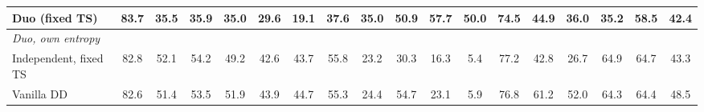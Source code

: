 \begin{table}[t]
{\begin{tabular}{l|c|ccc|cccc|cccc|cccc|c}
        \quad Duo (fixed TS) & 83.7 & 35.5 & 35.9 & 35.0 & 29.6 & 19.1 & 37.6 & 35.0 & 50.9 & 57.7 & 50.0 & 74.5 & 44.9 & 36.0 & 35.2 & 58.5 & 42.4 \\
        \midrule
        \multicolumn{18}{l}{\textit{Duo, own entropy}} \\
        \quad Independent, fixed TS & 82.8 & 52.1 & 54.2 & 49.2 & 42.6 & 43.7 & 55.8 & 23.2 & 30.3 & 16.3 & 5.4 & 77.2 & 42.8 & 26.7 & 64.9 & 64.7 & 43.3 \\
        \quad Vanilla DD & 82.6 & 51.4 & 53.5 & 51.9 & 43.9 & 44.7 & 55.3 & 24.4 & 54.7 & 23.1 & 5.9 & 76.8 & 61.2 & 52.0 & 64.3 & 64.4 & 48.5 \\
        \bottomrule
    \end{tabular}%
    }
\end{table}
